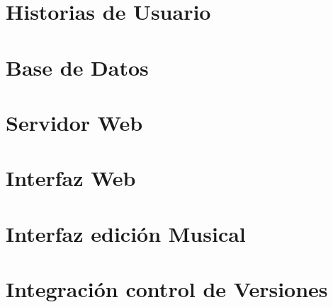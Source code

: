 \section{Historias de Usuario}
\section{Base de Datos}
\section{Servidor Web}
\section{Interfaz Web}
\section{Interfaz edición Musical}
\section{Integración control de Versiones}
